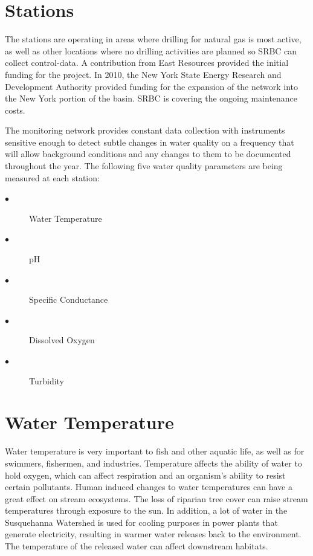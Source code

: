 \documentclass[a4paper]{article}
\begin{document}
\newpage
\begin{minipage}[t]{0.45\textwidth}
\section*{\small Stations}
{\normalsize  The stations are operating in areas where drilling for natural gas is most active, as well as other locations where no drilling activities are planned so SRBC can collect control-data. A contribution from East Resources provided the initial funding for the project. In 2010, the New York State Energy Research and Development Authority provided funding for the expansion of the network into the New York portion of the basin. SRBC is covering the ongoing maintenance costs.\\ \par
The monitoring network provides constant data collection with instruments sensitive enough to detect subtle changes in water quality on a frequency that will allow background conditions and any changes to them to be documented throughout the year. The following five water quality parameters are being measured at each station:
\begin{description}
  \item[$\bullet$ ] Water Temperature
  \item[$\bullet$ ] pH
   \item[$\bullet$ ] Specific Conductance
   \item[$\bullet$ ] Dissolved Oxygen
   \item[$\bullet$ ] Turbidity
\end{description}
}
\section*{\small Water Temperature}
{\normalsize Water temperature is very important to fish and other aquatic life, as well as for swimmers, fishermen, and industries. Temperature affects the ability of water to hold oxygen, which can affect respiration and an organism's ability to resist certain pollutants. Human induced changes to water temperatures can have a great effect on stream ecosystems. The loss of riparian tree cover can raise stream temperatures through exposure to the sun. In addition, a lot of water in the Susquehanna Watershed is used for cooling purposes in power plants that generate electricity, resulting in warmer water releases back to the environment. The temperature of the released water can affect downstream habitats.}

\end{minipage}
\end{document}

